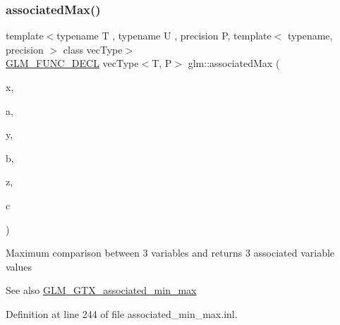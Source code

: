 \mbox{\label{group__gtx__associated__min__max_ga553431a468e251623408603bcb51c9cb}} 
\subsubsection{\texorpdfstring{associatedMax()}{associatedMax()}\hspace{0.1cm}{\footnotesize\ttfamily [7/12]}}
{\footnotesize\ttfamily template$<$typename T , typename U , precision P, template$<$ typename, precision $>$ class vec\+Type$>$ \\
\mbox{\hyperlink{setup_8hpp_ab2d052de21a70539923e9bcbf6e83a51}{G\+L\+M\+\_\+\+F\+U\+N\+C\+\_\+\+D\+E\+CL}} vec\+Type$<$T, P$>$ glm\+::associated\+Max (\begin{DoxyParamCaption}\item[{T}]{x,  }\item[{vec\+Type$<$ U, P $>$ const \&}]{a,  }\item[{T}]{y,  }\item[{vec\+Type$<$ U, P $>$ const \&}]{b,  }\item[{T}]{z,  }\item[{vec\+Type$<$ U, P $>$ const \&}]{c }\end{DoxyParamCaption})}

Maximum comparison between 3 variables and returns 3 associated variable values \begin{DoxySeeAlso}{See also}
\mbox{\hyperlink{group__gtx__associated__min__max}{G\+L\+M\+\_\+\+G\+T\+X\+\_\+associated\+\_\+min\+\_\+max}} 
\end{DoxySeeAlso}


Definition at line 244 of file associated\+\_\+min\+\_\+max.\+inl.

\mbox{\label{group__gtx__associated__min__max_ga327136e6a568569c03a056f90814b656}} 
